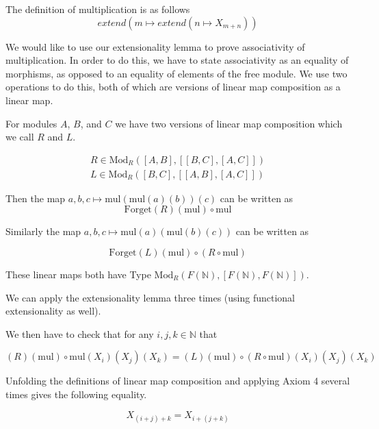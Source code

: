 \documentclass[12pt]{article} %
\theoremstyle{definition}
\theoremstyle{definition}
\theoremstyle{definition}
\theoremstyle{definition}
\begin{document}
The definition of multiplication is as follows
\begin{equation}
  extend (m \mapsto extend (n \mapsto X_{m + n}))
\end{equation}

We would like to use our extensionality lemma to prove associativity of multiplication.
In order to do this, we have to state associativity as an equality of morphisms,
as opposed to an equality of elements of the free module. We use two operations
to do this, both of which are versions of linear map composition as a linear map.

For modules $A$, $B$, and $C$ we have two versions of linear map 
composition which we call $R$ and $L$.

\begin{equation}
  \begin{aligned}
    R \in \text{Mod}_R([A, B], [[B,C],[A,C]]) \\
     L \in \text{Mod}_R([B, C], [[A,B],[A,C]])
  \end{aligned}
\end{equation}

Then the map $a, b, c \mapsto \text{mul} (\text{mul} (a)(b))(c)$ can be written as 
\begin{equation}
  \text{Forget}(R)(\text{mul}) \circ \text{mul}
\end{equation}

Similarly the map $a, b, c \mapsto \text{mul} (a)(\text{mul} (b)(c))$ can be written as

\begin{equation}
  \text{Forget}(L) (\text{mul}) \circ (R \circ \text{mul})
\end{equation}

These linear maps both have Type $\text{Mod}_R(F(\mathbb{N}), [F(\mathbb{N}), F(\mathbb{N})])$.

We can apply the extensionality lemma three times (using functional extensionality as well).

We then have to check that for any $i, j, k \in \mathbb{N}$ that

\begin{equation}
  (R)(\text{mul}) \circ \text{mul}(X_i)(X_j)(X_k) = (L) (\text{mul}) \circ (R \circ \text{mul})(X_i)(X_j)(X_k)
\end{equation}

Unfolding the definitions of linear map composition and applying Axiom 4 several times gives
the following equality.

\begin{equation}
  X_{(i + j) + k} = X_{i + (j + k)}
\end{equation}
\end{document}
